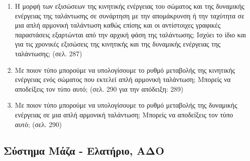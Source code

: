 \documentclass{article}
\begin{document}
\begin{enumerate}
      \item Η μορφή των εξισώσεων της κινητικής ενέργειας του σώματος και της δυναμικής ενέργειας της ταλάντωσης σε συνάρτηση με την απομάκρυνση ή την ταχύτητα σε μια απλή αρμονική ταλάντωση καθώς επίσης και οι αντίστοιχες γραφικές παραστάσεις εξαρτώνται από την αρχική φάση της ταλάντωσης; Ισχύει το ίδιο και για τις χρονικές εξισώσεις της κινητικής και της δυναμικής ενέργειας της ταλάντωσης; (σελ. 287)

      \item Με ποιον τύπο μπορούμε να υπολογίσουμε το ρυθμό μεταβολής της κινητικής ενέργειας ενός σώματος που εκτελεί απλή αρμονική ταλάντωση; Μπορείς να αποδείξεις τον τύπο αυτό; (σελ. 290 για την απόδειξη: 289)

      \item Με ποιον τύπο μπορούμε να υπολογίσουμε το ρυθμό μεταβολής της δυναμικής ενέργειας σε μια απλή αρμονική ταλάντωση; Μπορείς να αποδείξεις τον τύπο αυτό; (σελ. 290)
\end{enumerate}

\subsection{Σύστημα Μάζα - Ελατήριο, ΑΔΟ}
\end{document}
